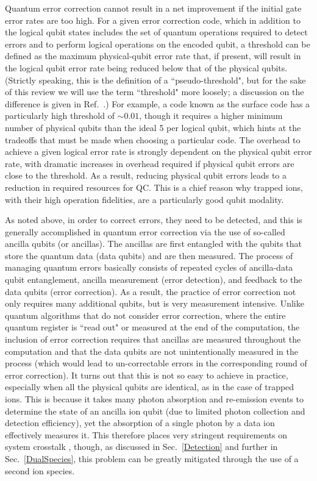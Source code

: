 \documentclass[%
12pt,
 amsmath,amssymb,
]{revtex4-2}
\begin{document}
Quantum error correction cannot result in a net improvement if the initial gate error rates are too high.  For a given error correction code, which in addition to the logical qubit states includes the set of quantum operations required to detect errors and to perform logical operations on the encoded qubit, a threshold can be defined as the maximum physical-qubit error rate that, if present, will result in the logical qubit error rate being reduced below that of the physical qubits.  (Strictly speaking, this is the definition of a ``pseudo-threshold", but for the sake of this review we will use the term ``threshold" more loosely; a discussion on the difference is given in Ref.~\cite{SvoreFT2006}.)  For example, a code known as the surface code \cite{RaussendorfSurfaceCode2007} has a particularly high threshold of ${\sim}0.01$, though it requires a higher minimum number of physical qubits than the ideal 5 per logical qubit, which hints at the tradeoffs that must be made when choosing a particular code.  The overhead to achieve a given logical error rate is strongly dependent on the physical qubit error rate, with dramatic increases in overhead required if physical qubit errors are close to the threshold.  As a result, reducing physical qubit errors leads to a reduction in required resources for QC.  This is a chief reason why trapped ions, with their high operation fidelities, are a particularly good qubit modality.

As noted above, in order to correct errors, they need to be detected, and this is generally accomplished in quantum error correction via the use of so-called ancilla qubits (or ancillas).  The ancillas are first entangled with the qubits that store the quantum data (data qubits) and are then measured.  The process of managing quantum errors basically consists of repeated cycles of ancilla-data qubit entanglement, ancilla measurement (error detection), and feedback to the data qubits (error correction).  As a result, the practice of error correction not only requires many additional qubits, but is very measurement intensive.  Unlike quantum algorithms that do not consider error correction, where the entire quantum register is ``read out" or measured at the end of the computation, the inclusion of error correction requires that ancillas are measured throughout the computation and that the data qubits are not unintentionally measured in the process (which would lead to un-correctable errors in the corresponding round of error correction).  It turns out that this is not so easy to achieve in practice, especially when all the physical qubits are identical, as in the case of trapped ions.  This is because it takes many photon absorption and re-emission events to determine the state of an ancilla ion qubit (due to limited photon collection and detection efficiency), yet the absorption of a single photon by a data ion effectively measures it.  This therefore places very stringent requirements on system crosstalk \cite{BruzewiczQLAR2017}, though, as discussed in Sec.~\ref{Detection} and further in Sec.~\ref{DualSpecies}, this problem can be greatly mitigated through the use of a second ion species.
\end{document}
